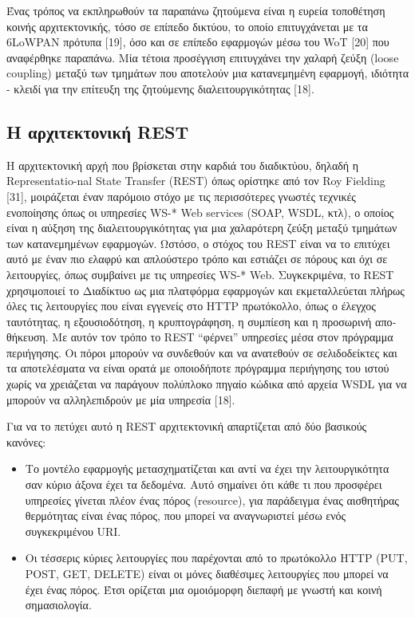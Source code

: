 	Ένας τρόπος να εκπληρωθούν τα παραπάνω ζητούμενα είναι η ευρεία τοποθέτηση κοινής αρχιτεκτονικής, τόσο σε επίπεδο δικτύου, το οποίο επιτυγχάνεται με τα 6LoWPAN πρότυπα [19], όσο και σε επίπεδο εφαρμογών μέσω του WoT [20] που αναφέρθηκε παραπάνω. Μία τέτοια προσέγγιση επιτυγχάνει την χαλαρή ζεύξη (loose coupling) μεταξύ των τμημάτων που αποτελούν μια κατα­νεμημένη εφαρμογή, ιδιότητα - κλειδί για την επίτευξη της ζητού­μενης διαλειτουργικότητας [18]. 
	
\subsection{Η αρχιτεκτονική REST}
Η αρχιτεκτονική αρχή που βρίσκεται στην καρδιά του διαδικτύου, δηλαδή η Representatio-nal State Transfer (REST) όπως ορίστηκε από τον Roy Fielding [31], μοιράζεται έναν παρόμοιο στόχο με τις περισσότερες γνωστές τεχνικές ενοποίησης όπως οι υπηρεσίες WS-*  Web  services  (SOAP,  WSDL,  κτλ), ο οποίος εί­ναι η αύξηση της διαλειτουργικότητας για μια χαλαρότερη ζεύξη μεταξύ τμημάτων των κατανεμημένων εφαρμογών. Ωστόσο, ο στόχος του REST είναι να το επιτύχει αυτό με έναν πιο ελαφρύ και απλούστερο τρόπο και εστιάζει σε πόρους και όχι σε λειτουργίες, όπως συμβαίνει με τις υπηρεσίες WS-* Web. Συγκεκριμένα, το REST χρησιμοποιεί το Διαδίκτυο ως μια πλατφόρμα εφαρμογών και εκμεταλλεύεται πλήρως όλες τις λειτουργίες που είναι εγγε­νείς στο HTTP πρωτόκολλο, όπως ο έλεγχος ταυτότητας, η εξου­σιοδότηση, η κρυπτογράφηση, η συμπίεση και η προσωρινή απο­θήκευση. Με αυτόν τον τρόπο το REST “φέρνει” υπηρεσίες μέσα στον πρόγραμμα περιήγησης. Οι πόροι μπορούν να συνδεθούν και να ανατεθούν σε σελιδοδείκτες και τα αποτελέσματα να είναι ορατά με οποιοδήποτε πρόγραμμα περιήγησης του ιστού χωρίς να χρειάζεται να παράγουν πολύπλοκο πηγαίο κώδικα από αρχεία WSDL για να μπορούν να αλληλεπιδρούν με μία υπηρεσία [18]. 
	
	Για να το πετύχει αυτό η REST αρχιτεκτονική απαρτίζεται από δύο βασικούς κανόνες: 
	
\begin{itemize}
	\item{Το μοντέλο εφαρμογής μετασχηματίζεται και αντί να έχει την λειτουργικότητα σαν κύριο άξονα έχει τα δεδο­μένα. Αυτό σημαίνει ότι κάθε τι που προσφέρει υπηρε­σίες γίνεται πλέον ένας πόρος (resource), για παράδειγμα ένας αισθητήρας θερμότητας είναι ένας πόρος, που μπορεί να αναγνωριστεί μέσω ενός συγκεκριμένου URI.}
	\item{Οι τέσσερις κύριες λειτουργίες που παρέχονται από το πρωτόκολλο HTTP (PUT, POST, GET, DELETE) είναι οι μόνες διαθέσιμες λειτουργίες που μπορεί να έχει ένας πόρος. Έτσι ορίζεται μια ομοιόμορφη διεπαφή με γνωστή και κοινή σημασιολογία. }
\end{itemize}

